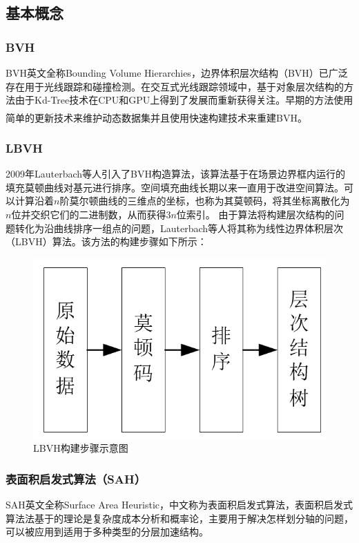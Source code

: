 \documentclass[11pt]{article}
\newcommand{\upcite}[1]{\textsuperscript{\textsuperscript{\cite{#1}}}}
\begin{document}
\subsection{基本概念}
\subsubsection{BVH}
BVH英文全称Bounding Volume Hierarchies，边界体积层次结构（BVH）已广泛存在用于光线跟踪和碰撞检测。在交互式光线跟踪领域中，基于对象层次结构的方法由于Kd-Tree技术在CPU和GPU上得到了发展而重新获得关注。早期的方法使用简单的更新技术来维护动态数据集并且使用快速构建技术来重建BVH\upcite{LBVH}。

\subsubsection{LBVH}
2009年Lauterbach等人引入了BVH构造算法，该算法基于在场景边界框内运行的填充莫顿曲线对基元进行排序。空间填充曲线长期以来一直用于改进空间算法。可以计算沿着$n$阶莫尔顿曲线的三维点的坐标，也称为其莫顿码，将其坐标离散化为$n$位并交织它们的二进制数，从而获得$3n$位索引。 由于算法将构建层次结构的问题转化为沿曲线排序一组点的问题，Lauterbach等人将其称为线性边界体积层次（LBVH）算法。该方法的构建步骤如下所示：
\begin{figure}[H]
\begin{center}
\includegraphics[scale=0.4]{LBVH.png}
\caption{LBVH构建步骤示意图}
\end{center}
\end{figure}

\subsubsection{表面积启发式算法（SAH）}
SAH英文全称Surface Area Heuristic，中文称为表面积启发式算法，表面积启发式算法法基于的理论是复杂度成本分析和概率论，主要用于解决怎样划分轴的问题，可以被应用到适用于多种类型的分层加速结构。
\end{document}
